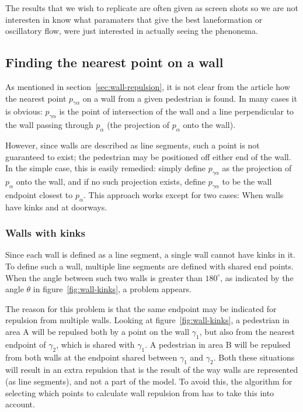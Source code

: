 The results that we wish to replicate are often given as 
screen shots so we are not interesten in know what paramaters 
that give the best laneformation or oscillatory flow, were 
just interested in actually seeing the phenonema.

\subsection{Finding the nearest point on a wall}
\label{sec:repulsion-points}
As mentioned in section~\ref{sec:wall-repulsion}, it is not clear from the 
article how the nearest point $p_{\gamma \alpha}$ on a wall from a given 
pedestrian is found. In many cases it is obvious: $p_{\gamma \alpha}$ is the 
point of intersection of the wall and a line perpendicular to the wall passing 
through $p_\alpha$ (the projection of $p_\alpha$ onto the wall).

However, since walls are described as line segments, such a point is not 
guaranteed to exist; the pedestrian may be positioned off either end of the 
wall. In the simple case, this is easily remedied: simply define $p_{\gamma 
\alpha}$ as the projection of $p_\alpha$ onto the wall, and if no such 
projection exists, define $p_{\gamma \alpha}$ to be the wall endpoint closest 
to $p_\alpha$. This approach works except for two cases: When walls have kinks 
and at doorways.

\subsubsection{Walls with kinks}
Since each wall is defined as a line segment, a single wall cannot have kinks 
in it. To define such a wall, multiple line segments are defined with shared 
end points. When the angle between such two walls is greater than $180^\circ$, 
as indicated by the angle $\theta$ in figure~\ref{fig:wall-kinks}, a 
problem appears.

The reason for this problem is that the same endpoint may be indicated for 
repulsion from multiple walls. Looking at figure~\ref{fig:wall-kinks}, a 
pedestrian in area A will be repulsed both by a point on the wall $\gamma_1$, 
but also from the nearest endpoint of $\gamma_2$, which is shared with 
$\gamma_1$. A pedestrian in area B will be repulsed from both walls at the 
endpoint shared between $\gamma_1$ and $\gamma_2$. Both these situations will 
result in an extra repulsion that is the result of the way walls are 
represented (as line segments), and not a part of the model. To avoid this, 
the algorithm for selecting which points to calculate wall repulsion from has 
to take this into account.

